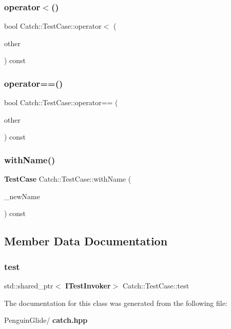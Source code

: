 \subsubsection{operator$<$()}
{\footnotesize\ttfamily bool Catch\+::\+Test\+Case\+::operator$<$ (\begin{DoxyParamCaption}\item[{\textbf{ Test\+Case} const \&}]{other }\end{DoxyParamCaption}) const}

\mbox{\label{class_catch_1_1_test_case_a5456d03a90f75292835c158f3a3374a1}} 
\subsubsection{operator==()}
{\footnotesize\ttfamily bool Catch\+::\+Test\+Case\+::operator== (\begin{DoxyParamCaption}\item[{\textbf{ Test\+Case} const \&}]{other }\end{DoxyParamCaption}) const}

\mbox{\label{class_catch_1_1_test_case_a0812e8a216d09b087d5874687009f0d6}} 
\subsubsection{withName()}
{\footnotesize\ttfamily \textbf{ Test\+Case} Catch\+::\+Test\+Case\+::with\+Name (\begin{DoxyParamCaption}\item[{std\+::string const \&}]{\+\_\+new\+Name }\end{DoxyParamCaption}) const}



\subsection{Member Data Documentation}
\mbox{\label{class_catch_1_1_test_case_a7aaa375d6f2bda735095eaa43395b54b}} 
\subsubsection{test}
{\footnotesize\ttfamily std\+::shared\+\_\+ptr$<$\textbf{ I\+Test\+Invoker}$>$ Catch\+::\+Test\+Case\+::test\hspace{0.3cm}{\ttfamily [private]}}



The documentation for this class was generated from the following file\+:\begin{DoxyCompactItemize}
\item 
Penguin\+Glide/\textbf{ catch.\+hpp}\end{DoxyCompactItemize}
